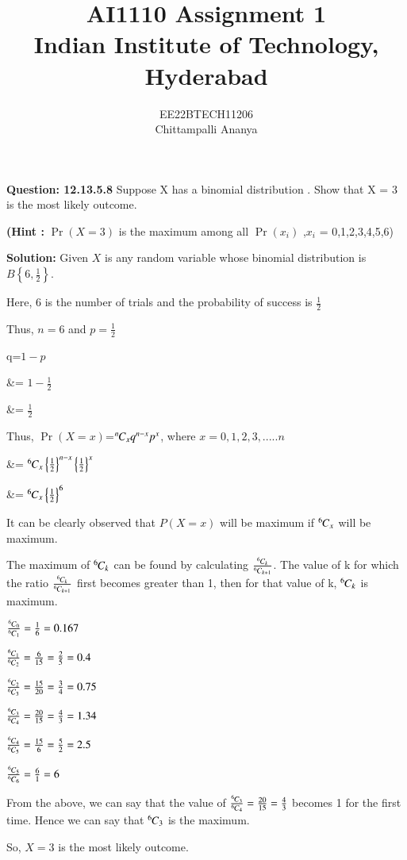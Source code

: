 \documentclass[journal,12pt,twocolumn]{IEEEtran}
\title{
AI1110 Assignment 1\\
  \Large Indian Institute of Technology, Hyderabad
}
\author{
  EE22BTECH11206\\[4pt]
  Chittampalli Ananya\\  
}
\providecommand{\pr}[1]{\ensuremath{\Pr\left(#1\right)}}
\providecommand{\cbrak}[1]{\ensuremath{\left\{#1\right\}}}
\theoremstyle{remark}
\newcommand{\permcomb}[4][0mu]{{{}^{#3}\mkern#1#2_{#4}}}
\newcommand{\comb}[1][-1mu]{\permcomb[#1]{C}}
\begin{document}
%
\maketitle
\textbf{Question: 12.13.5.8} 
Suppose X has a binomial distribution . Show that X = 3 is the most
likely outcome.

\textbf{(Hint :} \pr{X = 3} is the maximum among all \pr{x_i}
  ,$x_i$ = 0,1,2,3,4,5,6)

\textbf{Solution:}  Given $X$ is any random variable whose binomial distribution is $B\cbrak{6,\frac{1}{2}}$.

Here, $6$ is the number of trials and the probability of success is $\frac{1}{2}$ 

Thus, $n=6$ and $p=\frac{1}{2}$

q=$1-p$

&= $1-\frac{1}{2}$

&= $\frac{1}{2}$

Thus, $\pr{X=x}$=$\comb{n}{x}q^{n-x}p^x$, where $x=0,1,2,3,.....n$

&= $\comb{6}{x}\cbrak{\frac{1}{2}}^{n-x}\cbrak{\frac{1}{2}}^{x}$

&= $\comb{6}{x}\cbrak{\frac{1}{2}}^{6}$

It can be clearly observed that $P(X=x)$ will be maximum if $\comb{6}{x}$ will be maximum.

The maximum of $\comb{6}{k}$ can be found by calculating $\frac{\comb{6}{k}}{\comb{6}{k+1}}$. The value of k for which the ratio $\frac{\comb{6}{k}}{\comb{6}{k+1}}$ first becomes greater than 1, then for that value of k,  $\comb{6}{k}$ is maximum.

$\frac{\comb{6}{0}}{\comb{6}{1}}=\frac{1}{6}=0.167$

$\frac{\comb{6}{1}}{\comb{6}{2}}=\frac{6}{15}=\frac{2}{5}=0.4$

$\frac{\comb{6}{2}}{\comb{6}{3}}=\frac{15}{20}=\frac{3}{4}=0.75$ 

$\frac{\comb{6}{3}}{\comb{6}{4}}=\frac{20}{15}=\frac{4}{3}=1.34$

$\frac{\comb{6}{4}}{\comb{6}{5}}=\frac{15}{6}=\frac{5}{2} =2.5$

$\frac{\comb{6}{5}}{\comb{6}{6}}=\frac{6}{1}=6$

From the above, we can say that the value of  $\frac{\comb{6}{3}}{\comb{6}{4}}=\frac{20}{15}=\frac{4}{3}$ becomes 1 for the first time. Hence we can say that $\comb{6}{3}$ is the maximum.

So, $X=3$ is the most likely outcome.
\end{document}
